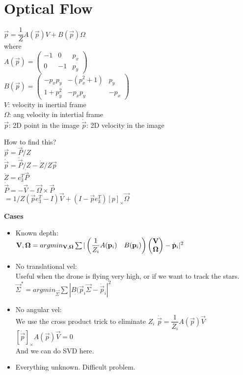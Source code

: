 \section{Optical Flow}
$\vec{p} = \dfrac{1}{Z} A(\vec{p}) V + B(\vec{p}) \Omega$\\
where \\
$A(\vec{p}) = \begin{pmatrix}
  -1 & 0 & p_x \\ 0 & -1 & p_y
\end{pmatrix}$\\
$B(\vec{p}) = \begin{pmatrix}
  -p_x p_y & -(p_x^2 +1) & p_y \\
  1 + p_y^2 & -p_x p_y & -p_x
\end{pmatrix}$\\
$V$: velocity in \alert{inertial frame}\\
$\Omega$: ang velocity in \alert{intertial frame}\\
$\vec{p}$: 2D point in the image
$\dot{\vec{p}}$: 2D velocity in the image

How to find this?\\
$\vec{p} = \vec{P}/Z$\\
$\dot{\vec{p}} = \dot{\vec{P}}/Z - \dot{Z}/Z \vec{p}$\\
$\dot{Z} = e_3^T \dot{\vec{P}}$\\
$\dot{\vec{P}} = - \vec{V} - \vec{\Omega} \times \vec{P}$\\
$=1/Z ( \vec{p} e_3^T - I) \vec{V} + (I - \vec{p} e_3^T)[p]_\times
\vec{\Omega}$

\textbf{Cases}
\begin{itemize}
  \item Known depth:\\
    $\vec{V}, \vec{\Omega} = argmin_{\vec{V}, \vec{\Omega}}\\
    \sum |\begin{pmatrix} \dfrac{1}{Z_i} A(\vec{p}_i) &
    B(\vec{p}_i)\end{pmatrix} 
    \begin{pmatrix}
      \vec{V}\\\vec{\Omega}
    \end{pmatrix} - \dot{\vec{p}}_i|^2$
  \item No translational vel:\\
    \alert{Useful when the drone is flying very high, or if we want to
    track the stars}.\\
    $\vec{\Sigma}^* = argmin_{\vec{\Sigma}}
    \sum |B(\vec{p}_i \vec{\Sigma} - \dot{\vec{p}}_i|^2$
  \item No angular vel:\\
    \alert{We use the cross product trick to eliminate $Z_i$}
    $\dot{\vec{p}} = \dfrac{1}{Z_i} A(\vec{p}) \vec{V}$\\
    $[\dot{\vec{p}}]_{\times} A(\vec{p}) \vec{V} = 0$\\
    And we can do SVD here.
  \item Everything unknown. Difficult problem.
\end{itemize}

